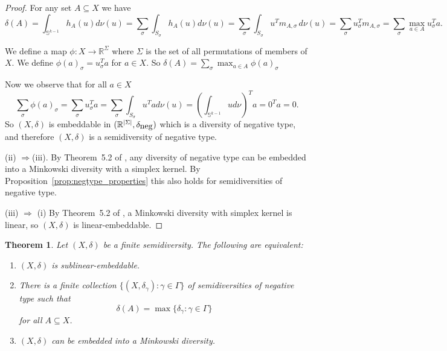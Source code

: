 \documentclass[11pt]{article}
\newtheorem{theorem}{Theorem}
\renewcommand{\Re}{\mathbb{R}}
\newcommand{\deltaneg}{\delta_{\mbox{\footnotesize{neg}}}}
\begin{document}
\begin{proof}

    For any set $A \subseteq X$ we have
    \[
    \delta(A) =   \int_{\mathbb{S}^{k-1}} h_A(u) d\nu(u) = \sum_{\sigma} \int_{S_\sigma} h_A(u) d\nu(u) =  \sum_{\sigma} \int_{S_\sigma}  u^T m_{A,\sigma} \,  d\nu(u) = \sum_{\sigma}   u_\sigma^T m_{A,\sigma} = \sum_\sigma \max_{a \in A} u_\sigma^T a.
    \]
   
We define a map $\phi \colon X \rightarrow \Re^{\Sigma}$ where $\Sigma$ is the set of all permutations of members of $X$. We define
\(
\phi(a)_\sigma = u_\sigma^T a 
\)
for $a \in X$. So 
\(
\delta (A) = \sum_{\sigma} \max_{a \in A} \phi(a)_\sigma
\)

Now we observe that for all $a \in X$
\[
\sum_{\sigma} \phi(a)_\sigma =  \sum_{\sigma}  u_\sigma^T a 
 =   \sum_{\sigma} \int_{S_\sigma} u^T a d\nu(u) 
 =   \left(  \int_{\mathbb{S}^{k-1}} u d \nu \right)^T a = 0^T a = 0.
\]
So $(X,\delta)$ is embeddable in $(\Re^{|\Sigma|},\deltaneg)$ which is a  diversity of negative type, and therefore $(X,\delta)$ is a semidiversity of negative type.

(ii) $\Rightarrow $(iii). By Theorem~5.2 of \cite{bryant2023diversities}, any diversity of negative type can be embedded into a Minkowski diversity with a simplex kernel. By Proposition~\ref{prop:negtype_properties} this also holds for semidiversities of negative type.

(iii) $\Rightarrow$ (i) By Theorem~5.2 of \cite{bryant2023diversities}, a Minkowski diversity with simplex kernel  is linear, so $(X,\delta)$ is linear-embeddable. 
\end{proof}


\begin{theorem} \label{thm:sublinearEmbed}
Let $(X,\delta)$ be a finite semidiversity. The following are equivalent:
\begin{enumerate}
\item[(i)]$(X,\delta)$  is sublinear-embeddable.
\item[(ii)] There is a finite collection $\{(X,\delta_\gamma):\gamma \in \Gamma\}$ of semidiversities of negative type such that 
\[\delta(A) = \max\{\delta_\gamma: \gamma \in \Gamma\}\]
for all $A \subseteq X$.
\item[(iii)] $(X,\delta)$ can be embedded into a Minkowski diversity.
\end{enumerate}
\end{theorem}
\end{document}
